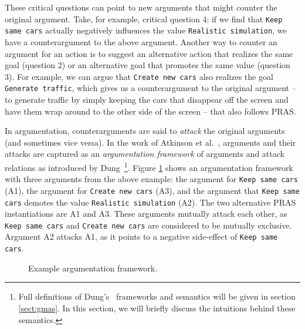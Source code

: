 These critical questions can point to new arguments that might counter the original argument. Take, for example, critical question 4: if we find that  \texttt{Keep same cars} actually negatively influences the value  \texttt{Realistic simulation}, we have a counterargument to the above argument. Another way to counter an argument for an action is to suggest an alternative action that realizes the same goal (question 2) or an alternative goal that promotes the same value (question 3). For example, we can argue that  \texttt{Create new cars} also realizes the goal  \texttt{Generate traffic}, which gives us a counterargument to the original argument -- to generate traffic by simply keeping the cars that disappear off the screen and have them wrap around to the other side of the screen -- that also follows PRAS.

In argumentation, counterarguments are said to \emph{attack} the original arguments (and sometimes vice versa). In the work of Atkinson et al.~\cite{atkinson2007}, arguments and their attacks are captured as an \emph{argumentation framework} of arguments and attack relations as introduced by Dung~\cite{Dung1995}\footnote{Full definitions of Dung's~\cite{Dung1995} frameworks and semantics will be given in section \ref{sect:gmas}. In this section, we will briefly discuss the intuitions behind these semantics.}. Figure \ref{fig:pras:example} shows an argumentation framework with three arguments from the above example: the argument for  \texttt{Keep same cars} (A1), the argument for \texttt{Create new cars} (A3), and the argument that \texttt{Keep same cars} demotes the value  \texttt{Realistic simulation} (A2). The two alternative PRAS instantiations are A1 and A3. These arguments mutually attack each other, as \texttt{Keep same cars}  and \texttt{Create new cars} are considered to be mutually exclusive. Argument A2 attacks A1, as it points to a negative side-effect of \texttt{Keep same cars}. 

\begin{figure}[ht!]
\centering
{}
\caption{Example argumentation framework.}
\label{fig:pras:example}
\end{figure}


